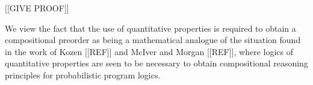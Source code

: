 [[GIVE PROOF]]

We view the fact that the use of quantitative properties is required to obtain a compositional preorder as being
a mathematical analogue of the situation found in the work of Kozen [[REF]] and McIver and Morgan [[REF]], where 
logics of quantitative properties are seen to be necessary to obtain compositional reasoning principles for 
probabilistic program logics.
